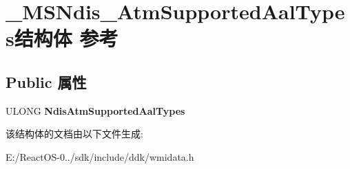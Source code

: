 \hypertarget{struct___m_s_ndis___atm_supported_aal_types}{}\section{\+\_\+\+M\+S\+Ndis\+\_\+\+Atm\+Supported\+Aal\+Types结构体 参考}
\label{struct___m_s_ndis___atm_supported_aal_types}
\subsection*{Public 属性}
\begin{DoxyCompactItemize}
\item 
\mbox{\label{struct___m_s_ndis___atm_supported_aal_types_a2c46fac8ab444fea52502220adaa806c}} 
U\+L\+O\+NG {\bfseries Ndis\+Atm\+Supported\+Aal\+Types}
\end{DoxyCompactItemize}


该结构体的文档由以下文件生成\+:\begin{DoxyCompactItemize}
\item 
E\+:/\+React\+O\+S-\/0../sdk/include/ddk/wmidata.\+h\end{DoxyCompactItemize}
